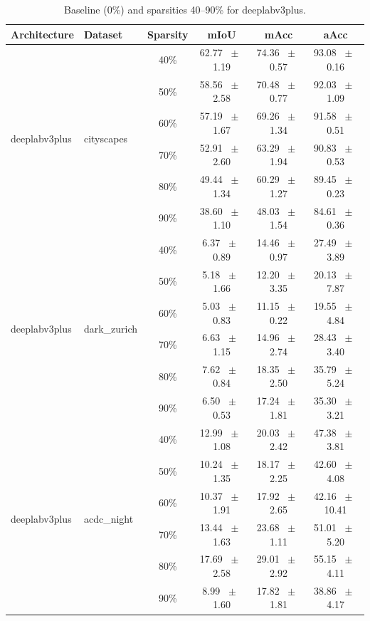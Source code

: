 \begin{table}[h]
  \centering
  \caption{Baseline (0\%) and sparsities 40--90\% for deeplabv3plus.}
  \begin{tabular}{@{}l l c c c c@{}}
    \toprule
    Architecture & Dataset & Sparsity & mIoU & mAcc & aAcc \\
    \midrule
    \multirow{6}{*}{deeplabv3plus} & \multirow{6}{*}{cityscapes} & 40\% & 62.77 ~$\pm$~ 1.19 & 74.36 ~$\pm$~ 0.57 & 93.08 ~$\pm$~ 0.16 \\
    & & 50\% & 58.56 ~$\pm$~ 2.58 & 70.48 ~$\pm$~ 0.77 & 92.03 ~$\pm$~ 1.09 \\
    & & 60\% & 57.19 ~$\pm$~ 1.67 & 69.26 ~$\pm$~ 1.34 & 91.58 ~$\pm$~ 0.51 \\
    & & 70\% & 52.91 ~$\pm$~ 2.60 & 63.29 ~$\pm$~ 1.94 & 90.83 ~$\pm$~ 0.53 \\
    & & 80\% & 49.44 ~$\pm$~ 1.34 & 60.29 ~$\pm$~ 1.27 & 89.45 ~$\pm$~ 0.23 \\
    & & 90\% & 38.60 ~$\pm$~ 1.10 & 48.03 ~$\pm$~ 1.54 & 84.61 ~$\pm$~ 0.36 \\
    \midrule
    \multirow{6}{*}{deeplabv3plus} & \multirow{6}{*}{dark_zurich} & 40\% & 6.37 ~$\pm$~ 0.89 & 14.46 ~$\pm$~ 0.97 & 27.49 ~$\pm$~ 3.89 \\
    & & 50\% & 5.18 ~$\pm$~ 1.66 & 12.20 ~$\pm$~ 3.35 & 20.13 ~$\pm$~ 7.87 \\
    & & 60\% & 5.03 ~$\pm$~ 0.83 & 11.15 ~$\pm$~ 0.22 & 19.55 ~$\pm$~ 4.84 \\
    & & 70\% & 6.63 ~$\pm$~ 1.15 & 14.96 ~$\pm$~ 2.74 & 28.43 ~$\pm$~ 3.40 \\
    & & 80\% & 7.62 ~$\pm$~ 0.84 & 18.35 ~$\pm$~ 2.50 & 35.79 ~$\pm$~ 5.24 \\
    & & 90\% & 6.50 ~$\pm$~ 0.53 & 17.24 ~$\pm$~ 1.81 & 35.30 ~$\pm$~ 3.21 \\
    \midrule
    \multirow{6}{*}{deeplabv3plus} & \multirow{6}{*}{acdc_night} & 40\% & 12.99 ~$\pm$~ 1.08 & 20.03 ~$\pm$~ 2.42 & 47.38 ~$\pm$~ 3.81 \\
    & & 50\% & 10.24 ~$\pm$~ 1.35 & 18.17 ~$\pm$~ 2.25 & 42.60 ~$\pm$~ 4.08 \\
    & & 60\% & 10.37 ~$\pm$~ 1.91 & 17.92 ~$\pm$~ 2.65 & 42.16 ~$\pm$~ 10.41 \\
    & & 70\% & 13.44 ~$\pm$~ 1.63 & 23.68 ~$\pm$~ 1.11 & 51.01 ~$\pm$~ 5.20 \\
    & & 80\% & 17.69 ~$\pm$~ 2.58 & 29.01 ~$\pm$~ 2.92 & 55.15 ~$\pm$~ 4.11 \\
    & & 90\% & 8.99 ~$\pm$~ 1.60 & 17.82 ~$\pm$~ 1.81 & 38.86 ~$\pm$~ 4.17 \\

\end{tabular}
\end{table}
